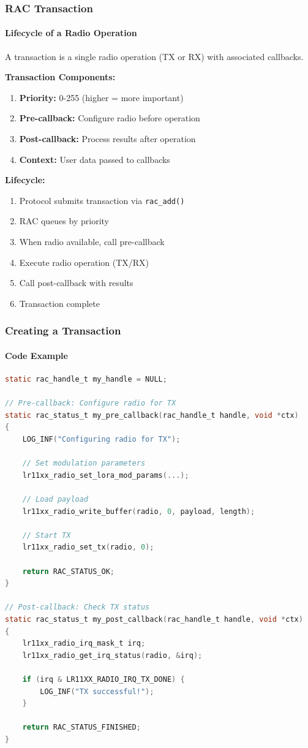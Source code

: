 \documentclass{beamer}
\begin{document}
\begin{frame}
\frametitle{RAC Transaction}
\framesubtitle{Lifecycle of a Radio Operation}

\begin{definition}[Transaction]
A transaction is a single radio operation (TX or RX) with associated callbacks.
\end{definition}

\textbf{Transaction Components:}
\begin{enumerate}
    \item \textbf{Priority:} 0-255 (higher = more important)
    \item \textbf{Pre-callback:} Configure radio before operation
    \item \textbf{Post-callback:} Process results after operation
    \item \textbf{Context:} User data passed to callbacks
\end{enumerate}

\vspace{1em}

\textbf{Lifecycle:}
\begin{enumerate}
    \item Protocol submits transaction via \texttt{rac\_add()}
    \item RAC queues by priority
    \item When radio available, call pre-callback
    \item Execute radio operation (TX/RX)
    \item Call post-callback with results
    \item Transaction complete
\end{enumerate}
\end{frame}

\begin{frame}[fragile]
\frametitle{Creating a Transaction}
\framesubtitle{Code Example}

\begin{lstlisting}[language=C, basicstyle=\tiny\ttfamily]
static rac_handle_t my_handle = NULL;

// Pre-callback: Configure radio for TX
static rac_status_t my_pre_callback(rac_handle_t handle, void *ctx)
{
    LOG_INF("Configuring radio for TX");

    // Set modulation parameters
    lr11xx_radio_set_lora_mod_params(...);

    // Load payload
    lr11xx_radio_write_buffer(radio, 0, payload, length);

    // Start TX
    lr11xx_radio_set_tx(radio, 0);

    return RAC_STATUS_OK;
}

// Post-callback: Check TX status
static rac_status_t my_post_callback(rac_handle_t handle, void *ctx)
{
    lr11xx_radio_irq_mask_t irq;
    lr11xx_radio_get_irq_status(radio, &irq);

    if (irq & LR11XX_RADIO_IRQ_TX_DONE) {
        LOG_INF("TX successful!");
    }

    return RAC_STATUS_FINISHED;
}
\end{lstlisting}
\end{frame}
\end{document}
